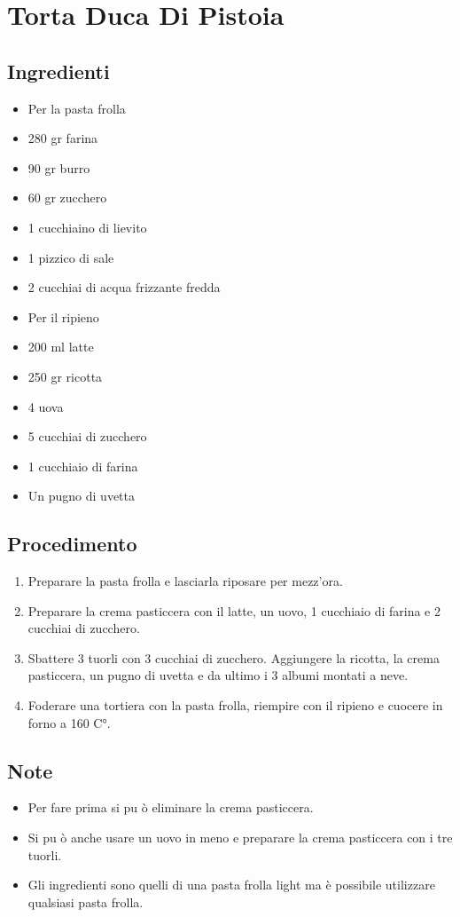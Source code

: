 \section{Torta Duca Di Pistoia}
\subsection{Ingredienti}
\begin{itemize}
\item Per la pasta frolla  
\item 280 gr farina  
\item 90 gr burro  
\item 60 gr zucchero  
\item 1 cucchiaino di lievito  
\item 1 pizzico di sale  
\item 2 cucchiai di acqua frizzante fredda  
\item Per il ripieno  
\item 200 ml latte  
\item 250 gr ricotta  
\item 4 uova  
\item 5 cucchiai di zucchero  
\item 1 cucchiaio di farina  
\item Un pugno di uvetta
\end{itemize}
\subsection{Procedimento}
\begin{enumerate}
\item  Preparare la pasta frolla e lasciarla riposare per mezz'ora.   
\item  Preparare la crema pasticcera con il latte, un uovo, 1 cucchiaio di farina e 2 cucchiai di zucchero.  
\item  Sbattere 3 tuorli con 3 cucchiai di zucchero. Aggiungere la ricotta, la crema pasticcera, un pugno di uvetta e da ultimo i 3 albumi montati a neve.  
\item  Foderare una tortiera con la pasta frolla, riempire con il ripieno e cuocere in forno a 160 C°.
\end{enumerate}
\subsection{Note}
\begin{itemize}
\item Per fare prima si pu ò eliminare la crema pasticcera.  
\item Si pu ò anche usare un uovo in meno e preparare la crema pasticcera con i tre tuorli.  
\item Gli ingredienti sono quelli di una pasta frolla light ma è possibile utilizzare qualsiasi pasta frolla.
\end{itemize}
